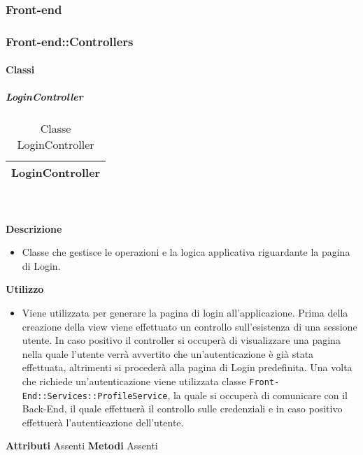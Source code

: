 
	\subsubsection{Front-end} 
	\subsubsection{Front-end::Controllers} 
		\paragraph{Classi}
			\subparagraph{LoginController} 
\begin{table}[ht]
\begin{center}
\bgroup
	\setlength{\arrayrulewidth}{0.6mm}
	\def\arraystretch{1}
		\begin{tabular}{ | p{12cm} | }
				\hline  
					\centerline{\textbf{LoginController}}
		\\ \hline 
				\hline
				\hline
		
		\end{tabular}
\egroup
\caption{Classe LoginController}
\end{center}
\end{table} \textbf{\\ \\ Descrizione}
\begin{itemize}
\item[] Classe che gestisce le operazioni e la logica applicativa riguardante la pagina di Login.
\end{itemize} 
\textbf{Utilizzo}
\begin{itemize}
\item[] Viene utilizzata per generare la pagina di login all'applicazione. Prima della creazione della view viene effettuato un controllo sull'esistenza di una sessione utente. In caso positivo il controller si occuperà di visualizzare una pagina nella quale l'utente verrà avvertito che un'autenticazione è già stata effettuata, altrimenti si procederà alla pagina di Login predefinita. Una volta che richiede un'autenticazione viene utilizzata classe \texttt{Front-End::Services::ProfileService}, la quale si occuperà di comunicare con il Back-End, il quale effettuerà il controllo sulle credenziali e in caso positivo effettuerà l'autenticazione dell'utente.
\end{itemize}
\textbf{Attributi}
Assenti
\textbf{Metodi}
Assenti

